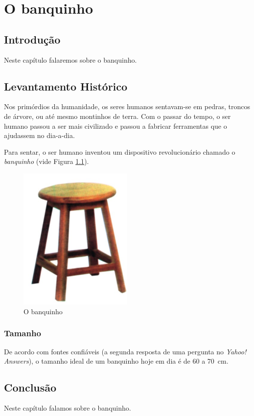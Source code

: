 \chapter{O banquinho}
\label{chap:banquinho}

\section{Introdução}

Neste capítulo falaremos sobre o banquinho.

\section{Levantamento Histórico}

Nos primórdios da humanidade, os seres humanos sentavam-se em
pedras, troncos de árvore, ou até mesmo montinhos de terra.
Com o passar do tempo, o ser humano passou a ser mais civilizado
e passou a fabricar ferramentas que o ajudassem no dia-a-dia.

Para sentar, o ser humano inventou um dispositivo revolucionário
chamado o \emph{banquinho} (vide Figura \ref{fig:banquinho}).

\begin{figure}[!htb]
  \centering
  \includegraphics[width=0.5\textwidth]{banquinho.jpg}
  \caption{O banquinho}
  \label{fig:banquinho}
\end{figure}

\subsection{Tamanho}

De acordo com fontes confiáveis (a segunda resposta de uma pergunta
no \textit{Yahoo! Answers}), o tamanho ideal de um banquinho hoje em
dia é de 60 a 70~cm.

\section{Conclusão}

Neste capítulo falamos sobre o banquinho.

